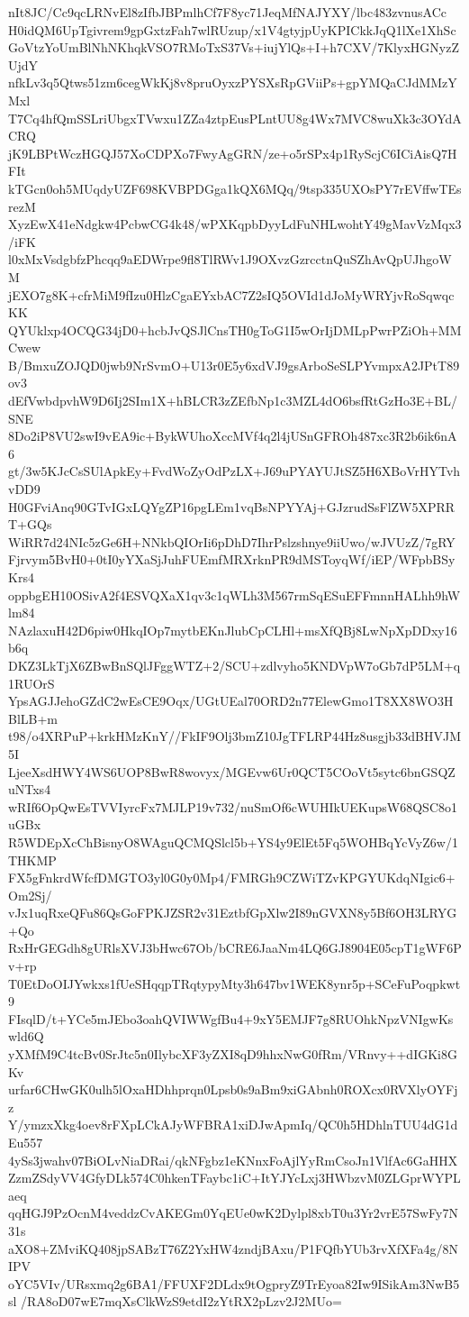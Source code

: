 nIt8JC/Cc9qcLRNvEl8zIfbJBPmlhCf7F8yc71JeqMfNAJYXY/lbc483zvnusACc
H0idQM6UpTgivrem9gpGxtzFah7wlRUzup/x1V4gtyjpUyKPICkkJqQ1lXe1XhSc
GoVtzYoUmBlNhNKhqkVSO7RMoTxS37Vs+iujYlQs+I+h7CXV/7KlyxHGNyzZUjdY
nfkLv3q5Qtws51zm6cegWkKj8v8pruOyxzPYSXsRpGViiPs+gpYMQaCJdMMzYMxl
T7Cq4hfQmSSLriUbgxTVwxu1ZZa4ztpEusPLntUU8g4Wx7MVC8wuXk3c3OYdACRQ
jK9LBPtWczHGQJ57XoCDPXo7FwyAgGRN/ze+o5rSPx4p1RyScjC6ICiAisQ7HFIt
kTGcn0oh5MUqdyUZF698KVBPDGga1kQX6MQq/9tsp335UXOsPY7rEVffwTEsrezM
XyzEwX41eNdgkw4PcbwCG4k48/wPXKqpbDyyLdFuNHLwohtY49gMavVzMqx3/iFK
l0xMxVsdgbfzPhcqq9aEDWrpe9fl8TlRWv1J9OXvzGzrcctnQuSZhAvQpUJhgoWM
jEXO7g8K+cfrMiM9fIzu0HlzCgaEYxbAC7Z2sIQ5OVId1dJoMyWRYjvRoSqwqcKK
QYUklxp4OCQG34jD0+hcbJvQSJlCnsTH0gToG1I5wOrIjDMLpPwrPZiOh+MMCwew
B/BmxuZOJQD0jwb9NrSvmO+U13r0E5y6xdVJ9gsArboSeSLPYvmpxA2JPtT89ov3
dEfVwbdpvhW9D6Ij2SIm1X+hBLCR3zZEfbNp1c3MZL4dO6bsfRtGzHo3E+BL/SNE
8Do2iP8VU2swI9vEA9ic+BykWUhoXccMVf4q2l4jUSnGFROh487xc3R2b6ik6nA6
gt/3w5KJcCsSUlApkEy+FvdWoZyOdPzLX+J69uPYAYUJtSZ5H6XBoVrHYTvhvDD9
H0GFviAnq90GTvIGxLQYgZP16pgLEm1vqBsNPYYAj+GJzrudSsFlZW5XPRRT+GQs
WiRR7d24NIc5zGe6H+NNkbQIOrIi6pDhD7IhrPslzshnye9iiUwo/wJVUzZ/7gRY
Fjrvym5BvH0+0tI0yYXaSjJuhFUEmfMRXrknPR9dMSToyqWf/iEP/WFpbBSyKrs4
oppbgEH10OSivA2f4ESVQXaX1qv3c1qWLh3M567rmSqESuEFFmnnHALhh9hWlm84
NAzlaxuH42D6piw0HkqIOp7mytbEKnJlubCpCLHl+msXfQBj8LwNpXpDDxy16b6q
DKZ3LkTjX6ZBwBnSQlJFggWTZ+2/SCU+zdlvyho5KNDVpW7oGb7dP5LM+q1RUOrS
YpsAGJJehoGZdC2wEsCE9Oqx/UGtUEal70ORD2n77ElewGmo1T8XX8WO3HBlLB+m
t98/o4XRPuP+krkHMzKnY//FkIF9Olj3bmZ10JgTFLRP44Hz8usgjb33dBHVJM5I
LjeeXsdHWY4WS6UOP8BwR8wovyx/MGEvw6Ur0QCT5COoVt5sytc6bnGSQZuNTxs4
wRIf6OpQwEsTVVIyrcFx7MJLP19v732/nuSmOf6cWUHIkUEKupsW68QSC8o1uGBx
R5WDEpXcChBisnyO8WAguQCMQSlcl5b+YS4y9ElEt5Fq5WOHBqYcVyZ6w/1THKMP
FX5gFnkrdWfcfDMGTO3yl0G0y0Mp4/FMRGh9CZWiTZvKPGYUKdqNIgic6+Om2Sj/
vJx1uqRxeQFu86QsGoFPKJZSR2v31EztbfGpXlw2I89nGVXN8y5Bf6OH3LRYG+Qo
RxHrGEGdh8gURlsXVJ3bHwc67Ob/bCRE6JaaNm4LQ6GJ8904E05cpT1gWF6Pv+rp
T0EtDoOIJYwkxs1fUeSHqqpTRqtypyMty3h647bv1WEK8ynr5p+SCeFuPoqpkwt9
FIsqlD/t+YCe5mJEbo3oahQVIWWgfBu4+9xY5EMJF7g8RUOhkNpzVNIgwKswld6Q
yXMfM9C4tcBv0SrJtc5n0IlybcXF3yZXI8qD9hhxNwG0fRm/VRnvy++dIGKi8GKv
urfar6CHwGK0ulh5lOxaHDhhprqn0Lpsb0s9aBm9xiGAbnh0ROXcx0RVXlyOYFjz
Y/ymzxXkg4oev8rFXpLCkAJyWFBRA1xiDJwApmIq/QC0h5HDhlnTUU4dG1dEu557
4ySs3jwahv07BiOLvNiaDRai/qkNFgbz1eKNnxFoAjlYyRmCsoJn1VlfAc6GaHHX
ZzmZSdyVV4GfyDLk574C0hkenTFaybc1iC+ItYJYcLxj3HWbzvM0ZLGprWYPLaeq
qqHGJ9PzOcnM4veddzCvAKEGm0YqEUe0wK2Dylpl8xbT0u3Yr2vrE57SwFy7N31s
aXO8+ZMviKQ408jpSABzT76Z2YxHW4zndjBAxu/P1FQfbYUb3rvXfXFa4g/8NIPV
oYC5VIv/URsxmq2g6BA1/FFUXF2DLdx9tOgpryZ9TrEyoa82Iw9ISikAm3NwB5sl
/RA8oD07wE7mqXsClkWzS9etdI2zYtRX2pLzv2J2MUo=
